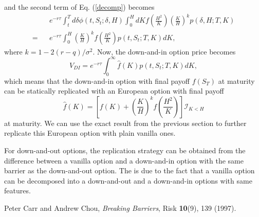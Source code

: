 \documentclass[12pt]{article}
\begin{document}
  and the second term of Eq. (\ref{decomp}) becomes
  \begin{eqnarray}
      &&e^{-r\tau}\int_t^Td\delta \phi(t,S_t;\delta,H)\int_0^HdK f\left(\frac{H^2}{K}\right)\left(\frac{K}{H}\right)^kp\left(\delta,H;T,K\right)\nonumber\\
    = &&e^{-r\tau}\int_0^H \left(\frac{K}{H}\right)^kf\left(\frac{H^2}{K}\right)p\left(t, S_t;T,K\right)dK,
  \end{eqnarray}
  where $k=1-2(r-q)/\sigma^2$. Now, the down-and-in option price becomes
  \begin{equation}
    V_{DI} = e^{-r\tau}\int_0^{\infty} \hat{f}(K)p\left(t, S_t;T,K\right)dK,
  \end{equation}
  which means that the down-and-in option with final payoff $f(S_T)$ at maturity can be statically replicated with an European option with final payoff \cite{CarrChou}
  \begin{equation}
    \hat{f}(K) = \left[f(K) + \left(\frac{K}{H}\right)^kf\left(\frac{H^2}{K}\right)\right]\mathcal{I}_{K<H}
  \end{equation}
  at maturity. We can use the exact result from the previous section to further replicate this European option with plain vanilla ones.

  For down-and-out options, the replication strategy can be obtained from the difference between a vanilla option and a down-and-in option with the same barrier
  as the down-and-out option. The is due to the fact that a vanilla option can be decomposed into a down-and-out and a down-and-in options with same features.


\begin{thebibliography}{99}
    Peter Carr and Andrew Chou, {\it Breaking Barriers}, Risk {\bf 10}(9), 139 (1997).

\end{thebibliography}
\end{document}
